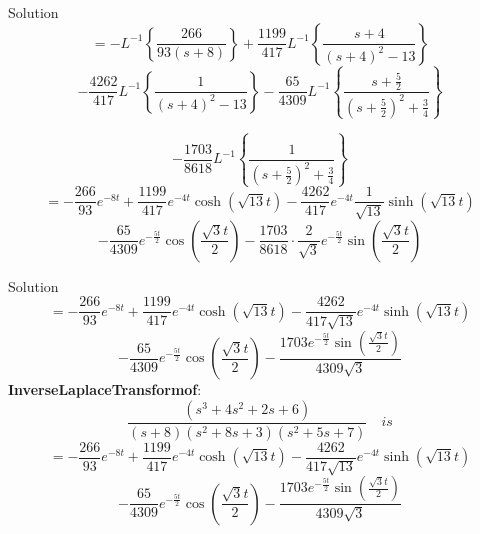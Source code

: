 \documentclass{beamer}
\theoremstyle{remark}
\numberwithin{equation}{section}
\begin{document}
\begin{frame}{Solution}
\begin{equation*}
    =-L^{-1}\left\{\frac{266}{93\left(s+8\right)}\right\}+\frac{1199}{417}L^{-1}\left\{\frac{s+4}{\left(s+4\right)^2-13}\right\}
\end{equation*}
\begin{equation*}
    -\frac{4262}{417}L^{-1}\left\{\frac{1}{\left(s+4\right)^2-13}\right\}-\frac{65}{4309}L^{-1}\left\{\frac{s+\frac{5}{2}}{\left(s+\frac{5}{2}\right)^2+\frac{3}{4}}\right\}
\end{equation*}

\begin{equation*}
    -\frac{1703}{8618}L^{-1}\left\{\frac{1}{\left(s+\frac{5}{2}\right)^2+\frac{3}{4}}\right\}
\end{equation*}
\begin{equation*}
    =-\frac{266}{93}e^{-8t}+\frac{1199}{417}e^{-4t}\cosh \left(\sqrt{13}t\right)-\frac{4262}{417}e^{-4t}\frac{1}{\sqrt{13}}\sinh \left(\sqrt{13}t\right)
\end{equation*}
\begin{equation*}
    -\frac{65}{4309}e^{-\frac{5t}{2}}\cos \left(\frac{\sqrt{3}t}{2}\right)-\frac{1703}{8618}\cdot \frac{2}{\sqrt{3}}e^{-\frac{5t}{2}}\sin \left(\frac{\sqrt{3}t}{2}\right)
\end{equation*}
\end{frame}
\begin{frame}{Solution}
\begin{equation*}
    =-\frac{266}{93}e^{-8t}+\frac{1199}{417}e^{-4t}\cosh \left(\sqrt{13}t\right)-\frac{4262}{417\sqrt{13}}e^{-4t}\sinh \left(\sqrt{13}t\right)
\end{equation*}
\begin{equation*}
    -\frac{65}{4309}e^{-\frac{5t}{2}}\cos \left(\frac{\sqrt{3}t}{2}\right)-\frac{1703e^{-\frac{5t}{2}}\sin \left(\frac{\sqrt{3}t}{2}\right)}{4309\sqrt{3}}
\end{equation*}
\therefore \textbf{Inverse}\:\textbf{Laplace}\:\textbf{Transform}\:\textbf{of}: \\
\begin{equation*}
    \frac{(s^3+4s^2+2s+6)}{(s+8)(s^2+8s+3)(s^2+5s+7)} \quad is
\end{equation*}
\begin{equation*}
    =-\frac{266}{93}e^{-8t}+\frac{1199}{417}e^{-4t}\cosh \left(\sqrt{13}t\right)-\frac{4262}{417\sqrt{13}}e^{-4t}\sinh \left(\sqrt{13}t\right)
\end{equation*}
\begin{equation*}
    -\frac{65}{4309}e^{-\frac{5t}{2}}\cos \left(\frac{\sqrt{3}t}{2}\right)-\frac{1703e^{-\frac{5t}{2}}\sin \left(\frac{\sqrt{3}t}{2}\right)}{4309\sqrt{3}}
\end{equation*}
\end{frame}
\end{document}
